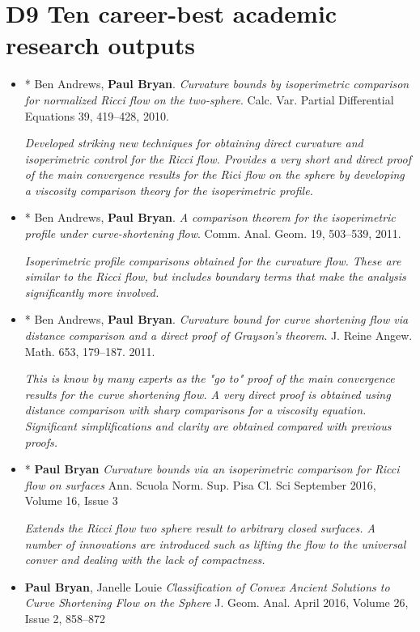 \documentclass[12pt]{article}
\author{Paul Bryan}
\date{}
\title{}
\begin{document}
\section*{D9 Ten career-best academic research outputs}
\label{sec:orgheadline1}

\begin{itemize}
\item * Ben Andrews, \textbf{Paul Bryan}. \emph{Curvature bounds by isoperimetric comparison for normalized Ricci flow on the two-sphere}. Calc. Var. Partial Differential Equations 39, 419--428, 2010.

\emph{Developed striking new techniques for obtaining direct curvature and isoperimetric control for the Ricci flow. Provides a very short and direct proof of the main convergence results for the Rici flow on the sphere by developing a viscosity comparison theory for the isoperimetric profile.}

\item * Ben Andrews, \textbf{Paul Bryan}. \emph{A comparison theorem for the isoperimetric profile under curve-shortening flow}. Comm. Anal. Geom. 19, 503--539, 2011.

\emph{Isoperimetric profile comparisons obtained for the curvature flow. These are similar to the Ricci flow, but includes boundary terms that make the analysis significantly more involved.}

\item * Ben Andrews, \textbf{Paul Bryan}. \emph{Curvature bound for curve shortening flow via distance comparison and a direct proof of Grayson's theorem}. J. Reine Angew. Math. 653, 179--187. 2011.

\emph{This is know by many experts as the "go to" proof of the main convergence results for the curve shortening flow. A very direct proof is obtained using distance comparison with sharp comparisons for a viscosity equation. Significant simplifications and clarity are obtained compared with previous proofs.}

\item * \textbf{Paul Bryan} \emph{Curvature bounds via an isoperimetric comparison for Ricci flow on surfaces} Ann. Scuola Norm. Sup. Pisa Cl. Sci September 2016, Volume 16, Issue 3

\emph{Extends the Ricci flow two sphere result to arbitrary closed surfaces. A number of innovations are introduced such as lifting the flow to the universal conver and dealing with the lack of compactness.}

\item \textbf{Paul Bryan}, Janelle Louie \emph{Classification of Convex Ancient Solutions to Curve Shortening Flow on the Sphere} J. Geom. Anal. April 2016, Volume 26, Issue 2, 858--872


\end{itemize}
\end{document}
